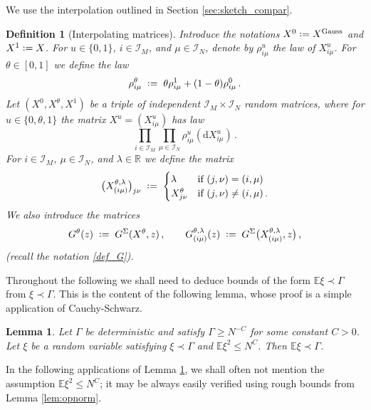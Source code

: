 \documentclass[11pt]{article} %
\numberwithin{equation}{section}
\numberwithin{figure}{section}
\theoremstyle{plain} %
\newtheorem{lemma}[theorem]{Lemma}
\newtheorem{definition}[theorem]{Definition}
\theoremstyle{definition} %
\renewcommand{\cal}{\mathcal}
\newcommand{\txt}[1]{\text{\rm{#1}}}
\newcommand{\E}{\mathbb{E}}
\newcommand{\R}{\mathbb{R}}
\newcommand{\dd}{\mathrm{d}}
\newcommand*{\deq}{\mathrel{\vcenter{\baselineskip0.65ex \lineskiplimit0pt \hbox{.}\hbox{.}}}=}
\renewcommand{\leq}{\leqslant}
\renewcommand{\geq}{\geqslant}
\newcommand{\pb}[1]{\bigl({#1}\bigr)}
\begin{document}
We use the interpolation outlined in Section \ref{sec:sketch_compar}.
\begin{definition}[Interpolating matrices]
Introduce the notations $X^0 \deq X^{\txt{Gauss}}$ and $X^1 \deq X$.
For $u \in\{0,1\}$, $i \in \cal I_M$, and $\mu \in \cal I_N$, denote by $\rho^u_{i \mu}$ the law of $X^u_{i \mu}$. For $\theta \in [0,1]$ we define the law
\begin{equation*}
\rho^\theta_{i \mu} \;\deq\; \theta \rho^1_{i \mu} + (1 - \theta) \rho^0_{i \mu}\,.
\end{equation*}
Let $(X^0, X^\theta, X^1)$ be a triple of independent $\cal I_M \times \cal I_N$ random matrices, where for $u \in \{0,\theta, 1\}$ the matrix $X^u = (X^u_{i \mu})$ has law
\begin{equation*}
\prod_{i \in \cal I_M} \prod_{\mu \in \cal I_N} \rho^u_{i \mu} (\dd X_{i \mu}^u)\,.
\end{equation*}
For $i \in \cal I_M$, $\mu \in \cal I_N$, and $\lambda \in \R$ we define the matrix
\begin{equation*}
\pb{X^{\theta,\lambda}_{(i\mu)}}_{j \nu} \;\deq\;
\begin{cases}
\lambda & \txt{if } (j,\nu) = (i,\mu)
\\
X^\theta_{j \nu} & \txt{if } (j,\nu) \neq (i,\mu)\,.
\end{cases}
\end{equation*}
We also introduce the matrices
\begin{equation*}
G^\theta(z) \;\deq\; G^\Sigma(X^\theta, z)
\,, \qquad
G^{\theta, \lambda}_{(i \mu)}(z) \;\deq\; G^\Sigma\pb{X^{\theta,\lambda}_{(i \mu)}, z}\,,
\end{equation*}
(recall the notation \eqref{def_G}).
\end{definition}

Throughout the following we shall need to deduce bounds of the form $\E \xi \prec \Gamma$ from $\xi \prec \Gamma$. This is the content of the following lemma, whose proof is a simple application of Cauchy-Schwarz.
\begin{lemma} \label{lem:E_prec}
Let $\Gamma$ be deterministic and satisfy $\Gamma \geq N^{-C}$ for some constant $C > 0$. Let $\xi$ be a random variable satisfying $\xi \prec \Gamma$ and $\E \xi^2 \leq N^C$. Then $\E \xi \prec \Gamma$.
\end{lemma}

In the following applications of Lemma \ref{lem:E_prec}, we shall often not mention the assumption $\E \xi^2 \leq N^C$; it may be always easily verified using rough bounds from Lemma \ref{lem:opnorm}.
\end{document}
